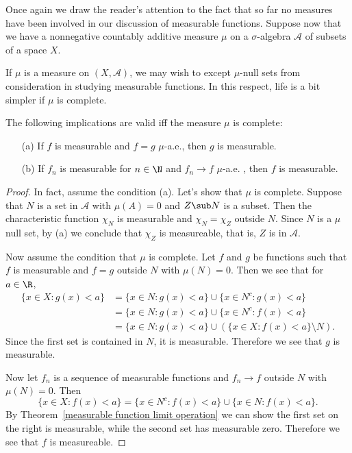 Once again we draw the reader's attention to the fact that so far no measures have been involved in our discussion of measurable functions. Suppose now that we have a nonnegative countably additive measure $\mu$ on a $\sigma$-algebra $\mathcal{A}$ of subsets of a space $X$.\par
If $\mu$ is a measure on $(X,\mathcal{A})$, we may wish to except $\mu$-null sets from consideration in studying measurable functions. In this respect, life is a bit simpler if $\mu$ is complete.
\begin{proposition}\label{measurable function complete measure iff}
The following implications are valid iff the measure $\mu$ is complete:
\begin{itemize}
\item[(a)] If $f$ is measurable and $f=g$ $\mu$-a.e., then $g$ is measurable.
\item[(b)] If $f_n$ is measurable for $n\in\N$ and $f_n\to f$ $\mu$-a.e. , then $f$ is measurable.
\end{itemize}
\end{proposition}
\begin{proof}
In fact, assume the condition (a). Let's show that $\mu$ is complete. Suppose that $N$ is a set in $\mathcal{A}$ with $\mu(A)=0$ and $Z\sub N$ is a subset. Then the characteristic function $\chi_N$ is measurable and $\chi_N=\chi_Z$ outside $N$. Since $N$ is a $\mu$ null set, by (a) we conclude that $\chi_Z$ is measureable, that is, $Z$ is in $\mathcal{A}$.\par
Now assume the condition that $\mu$ is complete. Let $f$ and $g$ be functions such that $f$ is measurable and $f=g$ outside $N$ with $\mu(N)=0$. Then we see that for $a\in\R$,
\begin{align*}
\{x\in X:g(x)<a\}&=\{x\in N:g(x)<a\}\cup\{x\in N^c:g(x)<a\}\\
&=\{x\in N:g(x)<a\}\cup\{x\in N^c:f(x)<a\}\\
&=\{x\in N:g(x)<a\}\cup(\{x\in X:f(x)<a\}\setminus N).
\end{align*}
Since the first set is contained in $N$, it is measurable. Therefore we see that $g$ is measurable.\par
Now let $f_n$ is a sequence of measurable functions and $f_n\to f$ outside $N$ with $\mu(N)=0$. Then
\[\{x\in X:f(x)<a\}=\{x\in N^c:f(x)<a\}\cup\{x\in N:f(x)<a\}.\]
By Theorem~\ref{measurable function limit operation} we can show the first set on the right is measurable, while the second set has measurable zero. Therefore we see that $f$ is measureable.
\end{proof}
